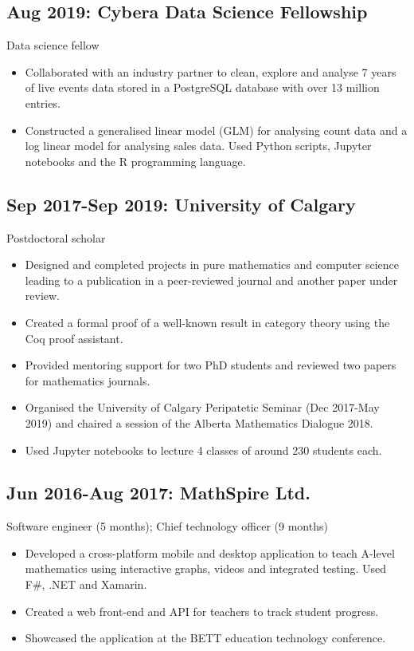\subsection*{Aug 2019: Cybera Data Science Fellowship}
Data science fellow
\begin{itemize}
\item Collaborated with an industry partner to clean, explore and analyse 7 years of live events data stored in a PostgreSQL database with over 13 million entries.
\item Constructed a generalised linear model (GLM) for analysing count data and a log linear model for analysing sales data. Used Python scripts, Jupyter notebooks and the R programming language.
\end{itemize}
\subsection*{Sep 2017-Sep 2019: University of Calgary}
Postdoctoral scholar
\begin{itemize}
\item Designed and completed projects in pure mathematics and computer science leading to a publication in a peer-reviewed journal and another paper under review.
\item Created a formal proof of a well-known result in category theory using the Coq proof assistant.
\item Provided mentoring support for two PhD students and reviewed two papers for mathematics journals.
\item Organised the University of Calgary Peripatetic Seminar (Dec 2017-May 2019) and chaired a session of the Alberta Mathematics Dialogue 2018.
\item Used Jupyter notebooks to lecture 4 classes of around 230 students each.
\end{itemize}
\subsection*{Jun 2016-Aug 2017: MathSpire Ltd.}
Software engineer (5 months); Chief technology officer (9 months)
\begin{itemize}
\item Developed a cross-platform mobile and desktop application to teach A-level mathematics using interactive graphs, videos and integrated testing. Used F\#, .NET and Xamarin.
\item Created a web front-end and API for teachers to track student progress.
\item Showcased the application at the BETT education technology conference.
\end{itemize}
